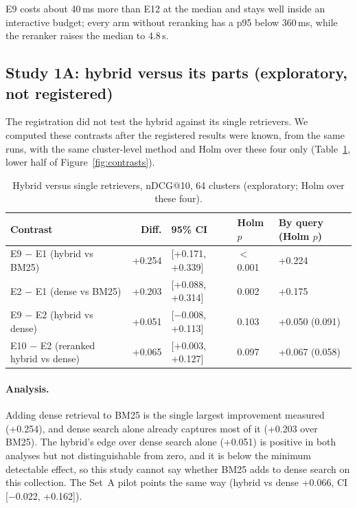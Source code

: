 \documentclass[pdflatex,sn-basic,Numbered]{sn-jnl}
\makeatletter
\newcommand{\ndcg}{nDCG@10}
\makeatother
\begin{document}
E9 costs about 40\,ms more than E12 at the median and stays well inside an interactive budget; every arm without reranking has a p95 below 360\,ms, while the reranker raises the median to 4.8\,s.

\subsection{Study 1A: hybrid versus its parts (exploratory, not registered)}

The registration did not test the hybrid against its single retrievers. We computed these contrasts after the registered results were known, from the same runs, with the same cluster-level method and Holm over these four only (Table~\ref{tab:hybrid}, lower half of Figure~\ref{fig:contrasts}).

\begin{table}[tbp]
\centering\footnotesize\setlength{\tabcolsep}{3pt}
\caption{Hybrid versus single retrievers, \ndcg{}, 64 clusters (exploratory; Holm over these four).}
\label{tab:hybrid}
\begin{tabular}{lrlll}
\toprule
Contrast & Diff. & 95\% CI & Holm $p$ & By query (Holm $p$) \\
\midrule
E9 $-$ E1 (hybrid vs BM25) & +0.254 & [+0.171, +0.339] & $<$0.001 & +0.224 \\
E2 $-$ E1 (dense vs BM25) & +0.203 & [+0.088, +0.314] & 0.002 & +0.175 \\
E9 $-$ E2 (hybrid vs dense) & +0.051 & [$-$0.008, +0.113] & 0.103 & +0.050 (0.091) \\
E10 $-$ E2 (reranked hybrid vs dense) & +0.065 & [+0.003, +0.127] & 0.097 & +0.067 (0.058) \\
\bottomrule
\end{tabular}
\end{table}

\paragraph{Analysis.} Adding dense retrieval to BM25 is the single largest improvement measured (+0.254), and dense search alone already captures most of it (+0.203 over BM25). The hybrid's edge over dense search alone (+0.051) is positive in both analyses but not distinguishable from zero, and it is below the minimum detectable effect, so this study cannot say whether BM25 adds to dense search on this collection. The Set~A pilot points the same way (hybrid vs dense +0.066, CI [$-$0.022, +0.162]).
\end{document}
